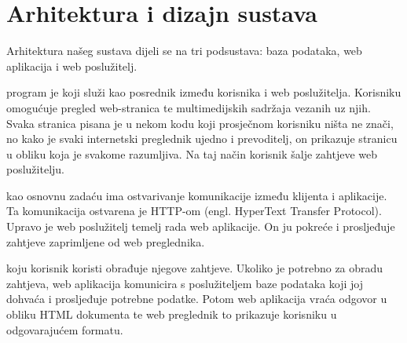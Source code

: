\chapter{Arhitektura i dizajn sustava}
		


		Arhitektura našeg sustava dijeli se na tri podsustava: baza podataka, web aplikacija i web poslužitelj.
			
		 program je koji služi kao posrednik između korisnika i web poslužitelja. Korisniku omogućuje pregled web-stranica te multimedijskih sadržaja vezanih uz njih. Svaka stranica pisana je u nekom kodu koji prosječnom korisniku ništa ne znači, no kako je svaki internetski preglednik ujedno i prevoditelj, on prikazuje stranicu u obliku koja je svakome razumljiva. Na taj način korisnik šalje zahtjeve web poslužitelju.
		
		 kao osnovnu zadaću ima ostvarivanje komunikacije između klijenta i aplikacije.  Ta komunikacija ostvarena je HTTP-om (engl. HyperText Transfer Protocol). Upravo je web poslužitelj temelj rada web aplikacije. On ju pokreće i prosljeđuje zahtjeve zaprimljene od web preglednika.
		
		 koju korisnik koristi obrađuje njegove zahtjeve. Ukoliko je potrebno za obradu zahtjeva, web aplikacija komunicira s poslužiteljem baze podataka koji joj dohvaća i prosljeđuje potrebne podatke. Potom web aplikacija vraća odgovor u obliku HTML dokumenta te web preglednik to prikazuje korisniku u odgovarajućem formatu.
		
